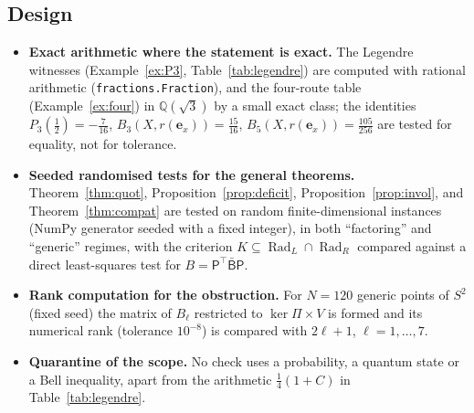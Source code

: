 \documentclass[11pt,a4paper]{article}
\newcommand{\Rad}{\operatorname{Rad}}
\theoremstyle{plain}
\theoremstyle{definition}
\begin{document}
\subsection{Design}
\begin{itemize}
\item \textbf{Exact arithmetic where the statement is exact.} The Legendre witnesses (Example~\ref{ex:P3}, Table~\ref{tab:legendre}) are computed with rational arithmetic (\texttt{fractions.Fraction}), and the four-route table (Example~\ref{ex:four}) in $\mathbb Q(\sqrt3)$ by a small exact class; the identities $P_3(\tfrac12)=-\tfrac7{16}$, $B_3(X,r(\mathbf e_x))=\tfrac{15}{16}$, $B_5(X,r(\mathbf e_x))=\tfrac{105}{256}$ are tested for equality, not for tolerance.
\item \textbf{Seeded randomised tests for the general theorems.} Theorem~\ref{thm:quot}, Proposition~\ref{prop:deficit}, Proposition~\ref{prop:invol}, and Theorem~\ref{thm:compat} are tested on random finite-dimensional instances (NumPy generator seeded with a fixed integer), in both ``factoring'' and ``generic'' regimes, with the criterion $K\subseteq\Rad_L\cap\Rad_R$ compared against a direct least-squares test for $B=\mathsf P^{\!\top}\bar{\mathsf B}\mathsf P$.
\item \textbf{Rank computation for the obstruction.} For $N=120$ generic points of $S^2$ (fixed seed) the matrix of $B_\ell$ restricted to $\ker\Pi\times V$ is formed and its numerical rank (tolerance $10^{-8}$) is compared with $2\ell+1$, $\ell=1,\dots,7$.
\item \textbf{Quarantine of the scope.} No check uses a probability, a quantum state or a Bell inequality, apart from the arithmetic $\frac14(1+C)$ in Table~\ref{tab:legendre}.
\end{itemize}
\end{document}
